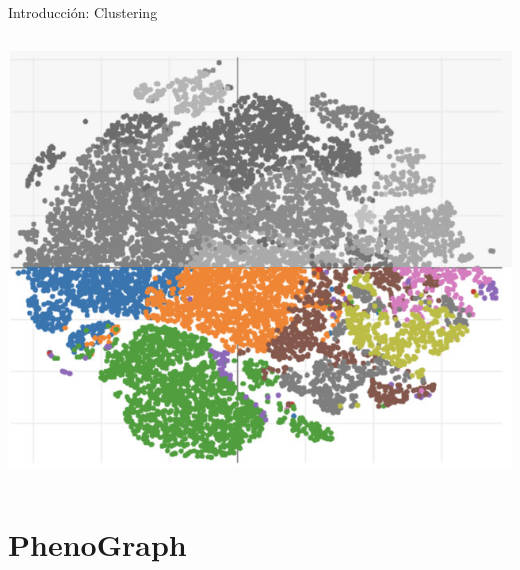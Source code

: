 \begin{frame}{Introducción: Clustering}
\begin{columns}
\begin{column}{0.4\textwidth}
\begin{textblock*}{5cm}
          \includegraphics[scale=.5]{images/10x_mod.jpg}
        \end{textblock*}
      \end{column}
    \end{columns}
  
    \begin{center}
      \fontsize{15}{7.2}\selectfont
    \end{center}
  \end{frame}
  
  
  
  \section{PhenoGraph}
  
